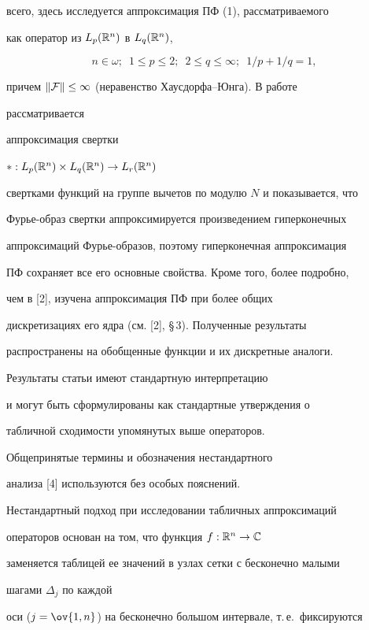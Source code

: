 всего, здесь исследуется аппроксимация ПФ (1), рассматриваемого 


как оператор из $L_p(\Bbb R^n)$ в $L_q(\Bbb R^n)$, 


\begin{equation} 


n\in\omega;\ \; 1\le p\le 2;\ \; 2\le q\le\infty; 


\ \; 1/p+1/q=1, 


\end{equation} 


причем $\|\cal F\|\le 1$ (неравенство Хаусдорфа--Юнга). В работе 


рассматривается 


аппроксимация свертки 


$*:L_p(\Bbb R^n)\times L_q(\Bbb R^n)\to L_r(\Bbb R^n)$ 


свертками функций на группе вычетов по модулю $N$ и показывается, что 


Фурье-образ свертки аппроксимируется произведением гиперконечных 


аппроксимаций Фурье-образов, поэтому гиперконечная аппроксимация 


ПФ сохраняет все его основные свойства. Кроме того, более подробно, 


чем в [2], изучена аппроксимация ПФ при более общих 


дискретизациях его ядра (см. [2], \S\,3). Полученные результаты 


распространены на обобщенные функции и их дискретные аналоги. 


Результаты статьи имеют стандартную интерпретацию 


и могут быть сформулированы как стандартные утверждения о 


табличной сходимости упомянутых выше операторов. 


Общепринятые термины и обозначения нестандартного 


анализа [4] используются без особых пояснений. 


Нестандартный подход при исследовании табличных аппроксимаций 


операторов основан на том, что функция $f:\Bbb R^n\to\Bbb C$ 


заменяется таблицей ее значений в узлах сетки с бесконечно малыми 


шагами $\Delta_j$ по каждой 


оси ($j=\ov{1,n}$) на бесконечно большом интервале, т.\,е.~фиксируются 


